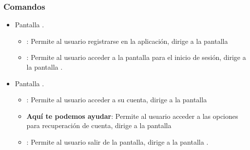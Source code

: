 \subsubsection{Comandos}
    \begin{itemize}
    	
    	\item Pantalla .
    	
    	\begin{itemize}
    		\item {}: Permite al usuario registrarse en la aplicación, dirige a la pantalla 
    		\item {}: Permite al usuario acceder a la pantalla para el inicio de sesión, dirige a la pantalla . 
    	\end{itemize}
    
		\item Pantalla .
		
		\begin{itemize}
			\item {}:  Permite al usuario acceder a su cuenta, dirige a la pantalla
			\item \textbf{Aquí te podemos ayudar}: Permite al usuario acceder a las opciones para recuperación de cuenta, dirige a la pantalla 
			\item \btnRegresar [Regresar]: Permite al usuario salir de la pantalla, dirige a la pantalla . 
		\end{itemize}
    \end{itemize}

